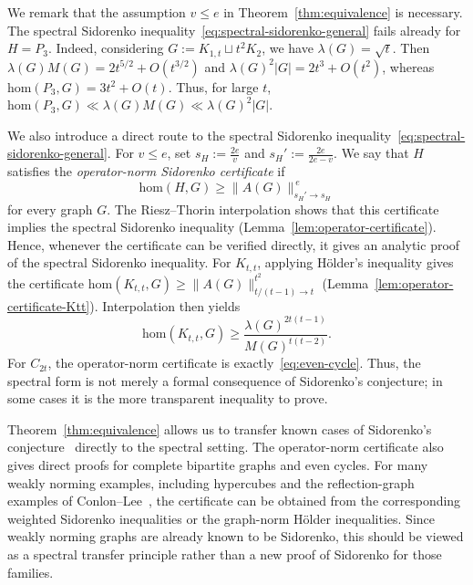 \documentclass[10pt,a4paper]{amsart}
\newcommand{\homc}{\mathrm{hom}}
\begin{document}
We remark that the assumption \(v\le e\) in Theorem~\ref{thm:equivalence} is necessary.
The spectral Sidorenko inequality~\eqref{eq:spectral-sidorenko-general} fails already for \(H=P_3\). Indeed, considering $G:=K_{1,t}\sqcup t^2 K_2$, we have $\lambda (G)=\sqrt{t}$. Then $\lambda(G)M(G)=2t^{5/2}+O(t^{3/2})$ and 
$\lambda(G)^2|G|=2t^3+ O(t^2)$, whereas 
$\homc(P_3,G)=3t^2+O(t)$. Thus, for large \(t\), \(\homc(P_3,G)\ll \lambda(G)M(G) \ll \lambda(G)^2|G| \). 




We also introduce a direct route to the spectral Sidorenko inequality~\eqref{eq:spectral-sidorenko-general}.  For \(v\le e\), set $s_H:=\frac{2e}{v}$ and $s_H':=\frac{2e}{2e-v}$.
We say that \(H\) satisfies the \emph{operator-norm Sidorenko
certificate} if
\[
        \homc(H,G)\ge \|A(G)\|_{s_H'\to s_H}^{\,e}
\]
for every graph \(G\).  The Riesz--Thorin interpolation shows that this
certificate implies the spectral Sidorenko inequality (Lemma~\ref{lem:operator-certificate}).  Hence, whenever the certificate can be verified directly, it gives an
analytic proof of the spectral Sidorenko inequality. For \(K_{t,t}\), applying H\"older's inequality gives the certificate 
$        \homc(K_{t,t},G)\ge \|A(G)\|_{t/(t-1)\to t}^{t^2}$ (Lemma~\ref{lem:operator-certificate-Ktt}). Interpolation then yields
\begin{equation}
\label{eq:Ktt}
        \homc(K_{t,t},G)
        \ge
        \frac{\lambda(G)^{2t(t-1)}}{M(G)^{t(t-2)}}.
\end{equation}
For $C_{2t}$, the operator-norm certificate is exactly~\eqref{eq:even-cycle}. Thus, the spectral form is not merely a formal consequence of Sidorenko's conjecture; in some cases it is the more transparent inequality to prove.


Theorem~\ref{thm:equivalence} allows us to transfer known cases of Sidorenko's conjecture~\cite{Sidorenko1993CorrelationInequality, ConlonFoxSudakov2010, Hatami2010, KimLeeLee2016, ConlonLee2017, ConlonKimLeeLee2018} directly to the spectral setting.  The operator-norm certificate also gives direct proofs for
complete bipartite graphs and even cycles.  For many weakly norming examples, including hypercubes and the
reflection-graph examples of Conlon--Lee~\cite{ConlonLee2017}, the
certificate can be obtained from the corresponding weighted Sidorenko inequalities or
the graph-norm H\"older inequalities.  Since weakly norming graphs are
already known to be Sidorenko, this should be viewed as a spectral
transfer principle rather than a new proof of Sidorenko for those
families.
\end{document}
